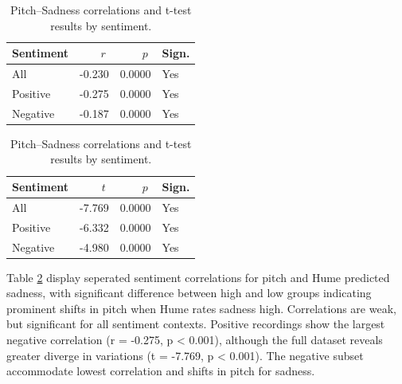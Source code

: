\begin{table}[H]
    \centering
  
    \begin{subtable}{0.45\textwidth}
      \centering
      \caption{Pitch and Sadness (r)}\label{tab:rq1_corr_pitch_sadness}
      \begin{tabular}{l r r l}
        \toprule
        Sentiment & \(\;r\;\) & \(\;p\;\) & Sign. \\
        \midrule
        All        & -0.230        & 0.0000    & Yes         \\
        Positive   & -0.275        & 0.0000    & Yes         \\
        Negative   & -0.187        & 0.0000    & Yes         \\
        \bottomrule
      \end{tabular}
    \end{subtable}\hfill
    \begin{subtable}{0.45\textwidth}
      \centering
      \caption{Pitch and Sadness (t-test)}\label{tab:rq1_ttest_pitch_sadness}
      \begin{tabular}{l r r l}
        \toprule
        Sentiment & \(\;t\;\) & \(\;p\;\) & Sign. \\
        \midrule
        All        & -7.769       & 0.0000    & Yes         \\
        Positive   & -6.332       & 0.0000    & Yes         \\
        Negative   & -4.980       & 0.0000    & Yes         \\
        \bottomrule
      \end{tabular}
    \end{subtable}
  
    \caption{Pitch–Sadness correlations and t-test results by sentiment.}
    \label{tab:rq1_pitch_sadness_side_by_side}
  \end{table}
  
  Table \ref{tab:rq1_pitch_sadness_side_by_side} display seperated sentiment correlations for pitch and Hume predicted sadness, with significant difference between high and low groups indicating prominent shifts in pitch when Hume rates sadness high. 
  Correlations are weak, but significant for all sentiment contexts. Positive recordings show the largest negative correlation (r = -0.275, p < 0.001), although the full dataset reveals greater diverge in variations (t = -7.769, p < 0.001). 
  The negative subset accommodate lowest correlation and shifts in pitch for sadness.     
  
